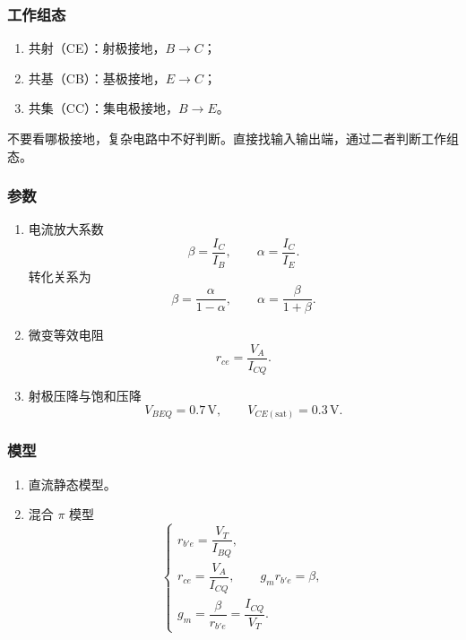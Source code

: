 \documentclass[UTF8,fontset=fandol,zihao=5]{ctexart}
\begin{document}
\subsubsection{工作组态}

\begin{enumerate}
  \item 共射（CE）：射极接地，$B\to C$；
  \item 共基（CB）：基极接地，$E\to C$；
  \item 共集（CC）：集电极接地，$B\to E$。
\end{enumerate}

\begin{methodbox}[【技巧】判断工作组态]
不要看哪极接地，复杂电路中不好判断。直接找输入输出端，通过二者判断工作组态。
\end{methodbox}

\subsubsection{参数}

\begin{enumerate}
  \item 电流放大系数
  \[
    \beta=\frac{I_C}{I_B},
    \qquad
    \alpha=\frac{I_C}{I_E}.
  \]
  转化关系为
  \[
    \beta=\frac{\alpha}{1-\alpha},
    \qquad
    \alpha=\frac{\beta}{1+\beta}.
  \]

  \item 微变等效电阻
  \[
    r_{ce}=\frac{V_A}{I_{CQ}}.
  \]

  \item 射极压降与饱和压降
  \[
    V_{BEQ}=0.7\,\mathrm V,
    \qquad
    V_{CE(\mathrm{sat})}=0.3\,\mathrm V.
  \]
\end{enumerate}

\subsubsection{模型}

\begin{enumerate}
  \item 直流静态模型。
  \item 混合 $\pi$ 模型
  \[
    \begin{cases}
      r_{b'e}=\dfrac{V_T}{I_{BQ}},\\[4pt]
      r_{ce}=\dfrac{V_A}{I_{CQ}},\qquad g_mr_{b'e}=\beta,\\[4pt]
      g_m=\dfrac{\beta}{r_{b'e}}=\dfrac{I_{CQ}}{V_T}.
    \end{cases}
  \]
\end{enumerate}
\end{document}
